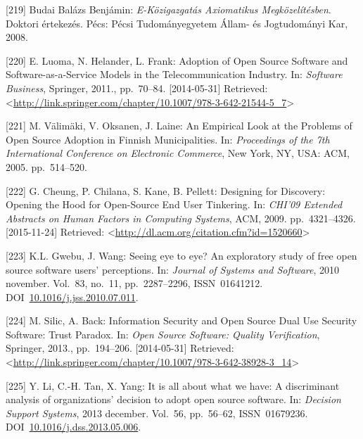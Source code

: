 \documentclass[12pt,magyar,a4paper,oneside]{scrreprt}
\begin{document}
\leavevmode\hypertarget{ref-budai_balazs_benjamin_e-kozigazgatas_2008}{}%
{[}219{]} Budai Balázs Benjámin: \emph{E-Közigazgatás Axiomatikus
Megközelítésben}. Doktori értekezés. Pécs: Pécsi Tudományegyetem Állam-
és Jogtudományi Kar, 2008.

\leavevmode\hypertarget{ref-luoma_adoption_2011}{}%
{[}220{]} E. Luoma, N. Helander, L. Frank: Adoption of Open Source
Software and Software-as-a-Service Models in the Telecommunication
Industry. In: \emph{Software Business}, Springer, 2011., pp.~70--84.
{[}2014-05-31{]} Retrieved:
\textless{}\url{http://link.springer.com/chapter/10.1007/978-3-642-21544-5_7}\textgreater{}

\leavevmode\hypertarget{ref-valimaki_empirical_2005}{}%
{[}221{]} M. Välimäki, V. Oksanen, J. Laine: An Empirical Look at the
Problems of Open Source Adoption in Finnish Municipalities. In:
\emph{Proceedings of the 7th International Conference on Electronic
Commerce}, New York, NY, USA: ACM, 2005. pp.~514--520.

\leavevmode\hypertarget{ref-cheung_designing_2009}{}%
{[}222{]} G. Cheung, P. Chilana, S. Kane, B. Pellett: Designing for
Discovery: Opening the Hood for Open-Source End User Tinkering. In:
\emph{CHI'09 Extended Abstracts on Human Factors in Computing Systems},
ACM, 2009. pp.~4321--4326. {[}2015-11-24{]} Retrieved:
\textless{}\url{http://dl.acm.org/citation.cfm?id=1520660}\textgreater{}

\leavevmode\hypertarget{ref-gwebu_seeing_2010}{}%
{[}223{]} K.L. Gwebu, J. Wang: Seeing eye to eye? An exploratory study
of free open source software users' perceptions. In: \emph{Journal of
Systems and Software}, 2010 november. Vol.~83, no.~11, pp.~2287--2296,
ISSN~01641212.
DOI~\href{https://doi.org/10.1016/j.jss.2010.07.011}{10.1016/j.jss.2010.07.011}.

\leavevmode\hypertarget{ref-silic_information_2013}{}%
{[}224{]} M. Silic, A. Back: Information Security and Open Source Dual
Use Security Software: Trust Paradox. In: \emph{Open Source Software:
Quality Verification}, Springer, 2013., pp.~194--206. {[}2014-05-31{]}
Retrieved:
\textless{}\url{http://link.springer.com/chapter/10.1007/978-3-642-38928-3_14}\textgreater{}

\leavevmode\hypertarget{ref-li_it_2013}{}%
{[}225{]} Y. Li, C.-H. Tan, X. Yang: It is all about what we have: A
discriminant analysis of organizations' decision to adopt open source
software. In: \emph{Decision Support Systems}, 2013 december. Vol.~56,
pp.~56--62, ISSN~01679236.
DOI~\href{https://doi.org/10.1016/j.dss.2013.05.006}{10.1016/j.dss.2013.05.006}.
\end{document}
